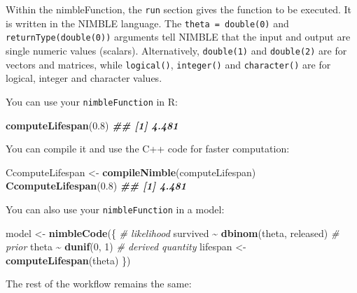 \documentclass[
  12pt,
]{krantz}
\newenvironment{Shaded}{\begin{snugshade}}{\end{snugshade}}
\newcommand{\CommentTok}[1]{\textcolor[rgb]{0.56,0.35,0.01}{\textit{#1}}}
\newcommand{\DecValTok}[1]{\textcolor[rgb]{0.00,0.00,0.81}{#1}}
\newcommand{\DocumentationTok}[1]{\textcolor[rgb]{0.56,0.35,0.01}{\textbf{\textit{#1}}}}
\newcommand{\FloatTok}[1]{\textcolor[rgb]{0.00,0.00,0.81}{#1}}
\newcommand{\FunctionTok}[1]{\textcolor[rgb]{0.13,0.29,0.53}{\textbf{#1}}}
\newcommand{\NormalTok}[1]{#1}
\newcommand{\OtherTok}[1]{\textcolor[rgb]{0.56,0.35,0.01}{#1}}
\newcommand{\SpecialCharTok}[1]{\textcolor[rgb]{0.81,0.36,0.00}{\textbf{#1}}}
\begin{document}
Within the nimbleFunction, the \texttt{run} section gives the function to be executed. It is written in the NIMBLE language. The \texttt{theta\ =\ double(0)} and \texttt{returnType(double(0))} arguments tell NIMBLE that the input and output are single numeric values (scalars). Alternatively, \texttt{double(1)} and \texttt{double(2)} are for vectors and matrices, while \texttt{logical()}, \texttt{integer()} and \texttt{character()} are for logical, integer and character values.

You can use your \texttt{nimbleFunction} in R:

\begin{Shaded}
\begin{Highlighting}[]
\FunctionTok{computeLifespan}\NormalTok{(}\FloatTok{0.8}\NormalTok{)}
\DocumentationTok{\#\# [1] 4.481}
\end{Highlighting}
\end{Shaded}

You can compile it and use the C++ code for faster computation:

\begin{Shaded}
\begin{Highlighting}[]
\NormalTok{CcomputeLifespan }\OtherTok{\textless{}{-}} \FunctionTok{compileNimble}\NormalTok{(computeLifespan)}
\FunctionTok{CcomputeLifespan}\NormalTok{(}\FloatTok{0.8}\NormalTok{)}
\DocumentationTok{\#\# [1] 4.481}
\end{Highlighting}
\end{Shaded}

You can also use your \texttt{nimbleFunction} in a model:

\begin{Shaded}
\begin{Highlighting}[]
\NormalTok{model }\OtherTok{\textless{}{-}} \FunctionTok{nimbleCode}\NormalTok{(\{}
  \CommentTok{\# likelihood}
\NormalTok{  survived }\SpecialCharTok{\textasciitilde{}} \FunctionTok{dbinom}\NormalTok{(theta, released)}
  \CommentTok{\# prior}
\NormalTok{  theta }\SpecialCharTok{\textasciitilde{}} \FunctionTok{dunif}\NormalTok{(}\DecValTok{0}\NormalTok{, }\DecValTok{1}\NormalTok{)}
  \CommentTok{\# derived quantity}
\NormalTok{  lifespan }\OtherTok{\textless{}{-}} \FunctionTok{computeLifespan}\NormalTok{(theta)}
\NormalTok{\})}
\end{Highlighting}
\end{Shaded}

The rest of the workflow remains the same:
\end{document}
